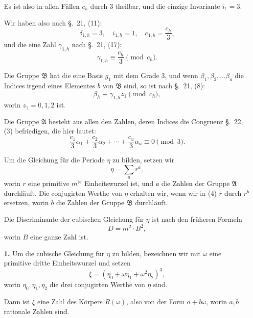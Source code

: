 \documentclass[12pt,a4paper]{article}
\theoremstyle{plain}
\theoremstyle{definition}
\theoremstyle{remark}
\begin{document}
Es ist also in allen Fällen $c_h$ durch $3$ theilbar, und die einzige Invariante $i_1 = 3$.

Wir haben also nach \S.~21, (11):
\[
\delta_{1,h} = 3, \quad i_{1,h} = 1, \quad c_{1,h} = \frac{c_h}{3},
\]
und die eine Zahl $\gamma_{1,h}$ nach \S.~21, (17):
\begin{equation}\tag{1}
\gamma_{1,h} \equiv \frac{c_h}{3} \pmod{c_h}.
\end{equation}

Die Gruppe $\mathfrak{B}$ hat die eine Basis $g_1$ mit dem Grade $3$, und wenn $\beta_1, \beta_2, \ldots \beta_u$ die Indices irgend eines Elementes $b$ von $\mathfrak{B}$ sind, so ist nach \S.~21, (8):
\begin{equation}\tag{2}
\beta_h \equiv \gamma_{1,h} z_1 \pmod{c_h},
\end{equation}
worin $z_1 = 0, 1, 2$ ist.

Die Gruppe $\mathfrak{A}$ besteht aus allen den Zahlen, deren Indices die Congruenz \S.~22, (3) befriedigen, die hier lautet:
\begin{equation}\tag{3}
\frac{c_1}{3} \alpha_1 + \frac{c_2}{3} \alpha_2 + \cdots + \frac{c_u}{3} \alpha_u \equiv 0 \pmod{3}.
\end{equation}

Um die Gleichung für die Periode $\eta$ zu bilden, setzen wir
\begin{equation}\tag{4}
\eta = \sum_{a} r^a,
\end{equation}
worin $r$ eine primitive $m^{\text{te}}$ Einheitswurzel ist, und $a$ die Zahlen der Gruppe $\mathfrak{A}$ durchläuft. Die conjugirten Werthe von $\eta$ erhalten wir, wenn wir in (4) $r$ durch $r^b$ ersetzen, worin $b$ die Zahlen der Gruppe $\mathfrak{B}$ durchläuft.

Die Discriminante der cubischen Gleichung für $\eta$ ist nach den früheren Formeln
\[
D = m^2 \cdot B^2,
\]
worin $B$ eine ganze Zahl ist.

\medskip\noindent\textbf{1.} Um die cubische Gleichung für $\eta$ zu bilden, bezeichnen wir mit $\omega$ eine primitive dritte Einheitswurzel und setzen
\begin{equation}\tag{5}
\xi = (\eta_0 + \omega \eta_1 + \omega^2 \eta_2)^3,
\end{equation}
worin $\eta_0, \eta_1, \eta_2$ die drei conjugirten Werthe von $\eta$ sind.

Dann ist $\xi$ eine Zahl des Körpers $R(\omega)$, also von der Form $a + b\omega$, worin $a, b$ rationale Zahlen sind.
\end{document}

